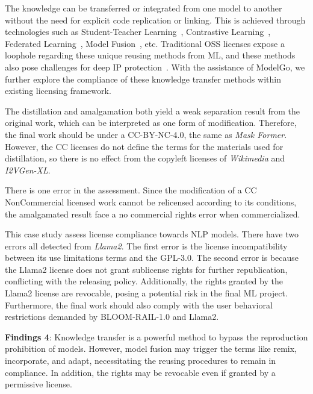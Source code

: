 The knowledge can be transferred or integrated from one model to another without the need for explicit code replication or linking. 
This is achieved through technologies such as Student-Teacher Learning~\cite{furlanello2018born}, Contrastive Learning~\cite{li2021model}, Federated Learning~\cite{mcmahan2017communication}, Model Fusion~\cite{lam2021model}, etc.
Traditional OSS licenses expose a loophole regarding these unique reusing methods from ML, and these methods also pose challenges for deep IP protection~\cite{peng2022intellectual}.
With the assistance of ModelGo, we further explore the compliance of these knowledge transfer methods within existing licensing framework.

The distillation and amalgamation both yield a weak separation result from the original work, which can be interpreted as one form of modification.
Therefore, the final work should be under a CC-BY-NC-4.0, the same as \textit{Mask Former}.
However, the CC licenses do not define the terms for the materials used for distillation, so there is no effect from the copyleft licenses of \textit{Wikimedia} and \textit{I2VGen-XL}.
 
There is one error in the assessment. 
Since the modification of a CC NonCommercial licensed work cannot be relicensed according to its conditions, the amalgamated result face a no commercial rights error when commercialized.

This case study assess license compliance towards NLP models.
There have two errors all detected from \textit{Llama2}.
The first error is the license incompatibility between its use limitations terms and the GPL-3.0.
The second error is because the Llama2 license does not grant sublicense rights for further republication, conflicting with the releasing policy.
Additionally, the rights granted by the Llama2 license are revocable, posing a potential risk in the final ML project.
Furthermore, the final work should also comply with the user behavioral restrictions demanded by BLOOM-RAIL-1.0 and Llama2.

\begin{tcolorbox}
\textbf{Findings 4}: Knowledge transfer is a powerful method to bypass the reproduction prohibition of models. 
However, model fusion may trigger the terms like remix, incorporate, and adapt, necessitating the reusing procedures to remain in compliance.
In addition, the rights may be revocable even if granted by a permissive license.
\end{tcolorbox}

